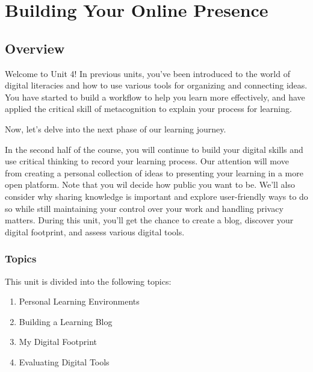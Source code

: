\documentclass[
]{book}
\providecommand{\tightlist}{%
  \setlength{\itemsep}{0pt}\setlength{\parskip}{0pt}}
\theoremstyle{definition}
\theoremstyle{definition}
\theoremstyle{definition}
\theoremstyle{definition}
\theoremstyle{remark}
\begin{document}
\hypertarget{building-your-online-presence}{%
\chapter{Building Your Online Presence}\label{building-your-online-presence}}

\hypertarget{overview-3}{%
\section*{Overview}\label{overview-3}}

Welcome to Unit 4! In previous units, you've been introduced to the world of digital literacies and how to use various tools for organizing and connecting ideas. You have started to build a workflow to help you learn more effectively, and have applied the critical skill of metacognition to explain your process for learning.

Now, let's delve into the next phase of our learning journey.

In the second half of the course, you will continue to build your digital skills and use critical thinking to record your learning process. Our attention will move from creating a personal collection of ideas to presenting your learning in a more open platform. Note that you wil decide how public you want to be. We'll also consider why sharing knowledge is important and explore user-friendly ways to do so while still maintaining your control over your work and handling privacy matters. During this unit, you'll get the chance to create a blog, discover your digital footprint, and assess various digital tools.

\hypertarget{topics-3}{%
\subsection*{Topics}\label{topics-3}}

This unit is divided into the following topics:

\begin{enumerate}
\def\labelenumi{\arabic{enumi}.}
\tightlist
\item
  Personal Learning Environments
\item
  Building a Learning Blog
\item
  My Digital Footprint
\item
  Evaluating Digital Tools
\end{enumerate}
\end{document}
